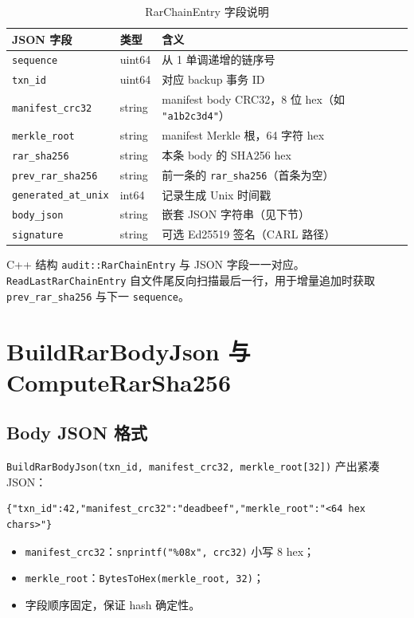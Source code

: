\begin{table}[htbp]
\centering
\caption{RarChainEntry 字段说明}
\small
\begin{tabular}{@{}llp{6.5cm}@{}}
\toprule
JSON 字段 & 类型 & 含义 \\
\midrule
\texttt{sequence} & uint64 & 从 1 单调递增的链序号 \\
\texttt{txn\_id} & uint64 & 对应 backup 事务 ID \\
\texttt{manifest\_crc32} & string & manifest body CRC32，8 位 hex（如 \texttt{"a1b2c3d4"}） \\
\texttt{merkle\_root} & string & manifest Merkle 根，64 字符 hex \\
\texttt{rar\_sha256} & string & 本条 body 的 SHA256 hex \\
\texttt{prev\_rar\_sha256} & string & 前一条的 \texttt{rar\_sha256}（首条为空） \\
\texttt{generated\_at\_unix} & int64 & 记录生成 Unix 时间戳 \\
\texttt{body\_json} & string & 嵌套 JSON 字符串（见下节） \\
\texttt{signature} & string & 可选 Ed25519 签名（CARL 路径） \\
\bottomrule
\end{tabular}
\end{table}

C++ 结构 \texttt{audit::RarChainEntry} 与 JSON 字段一一对应。\texttt{ReadLastRarChainEntry} 自文件尾反向扫描最后一行，用于增量追加时获取 \texttt{prev\_rar\_sha256} 与下一 \texttt{sequence}。

\section{BuildRarBodyJson 与 ComputeRarSha256}

\subsection{Body JSON 格式}

\texttt{BuildRarBodyJson(txn\_id, manifest\_crc32, merkle\_root[32])} 产出紧凑 JSON：

\begin{lstlisting}[caption={RAR body 示例},label={lst:rar-body}]
{"txn_id":42,"manifest_crc32":"deadbeef","merkle_root":"<64 hex chars>"}
\end{lstlisting}

\begin{itemize}[nosep]
  \item \texttt{manifest\_crc32}：\texttt{snprintf("\%08x", crc32)} 小写 8 hex；
  \item \texttt{merkle\_root}：\texttt{BytesToHex(merkle\_root, 32)}；
  \item 字段顺序固定，保证 hash 确定性。
\end{itemize}

